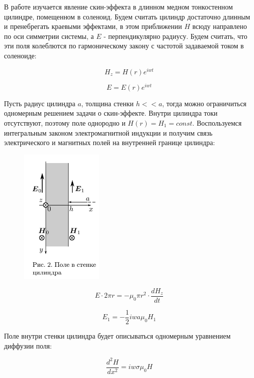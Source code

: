 \documentclass[a4paper,12pt]{article} %
\begin{document}
В работе изучается явление скин-эффекта в длинном медном тонкостенном цилиндре, помещенном в соленоид. Будем считать цилиндр достаточно длинным и пренебрегать краевыми эффектами, в этом приближении $H$ всюду направлено по оси симметрии системы, а $E$ - перпендикулярно радиусу. Будем считать, что эти поля колеблются по гармоническому закону с частотой задаваемой током в соленоиде:

\begin{equation}
	H_z = H(r)e^{iwt}
\end{equation}

\begin{equation}
	E = E(r)e^{iwt}
\end{equation}

Пусть радиус цилиндра $a$, толщина стенки $h << a$, тогда можно ограничиться одномерным решением задачи о скин-эффекте. Внутри цилиндра токи отсутствуют, поэтому поле однородно и $H(r) = H_1 = const$. Воспользуемся интегральным законом электромагнитной индукции и получим связь электрического и магнитных полей на внутренней границе цилиндра:

\begin{figure}
	\includegraphics[width=4cm]{Screenshot_2.png}
	\label{pic:2}
\end{figure}

\begin{equation}
	E\cdot 2\pi r = -\mu_0\pi r^2 \cdot \frac{dH_z}{dt}
\end{equation}

\begin{equation}
	E_1 = -\frac{1}{2}iwa\mu_0 H_1
\end{equation}

Поле внутри стенки цилиндра будет описываться одномерным уравнением диффузии поля:

\begin{equation}
	\frac{d^2H}{dx^2} = iw\sigma\mu_0H
\end{equation}
\end{document}
